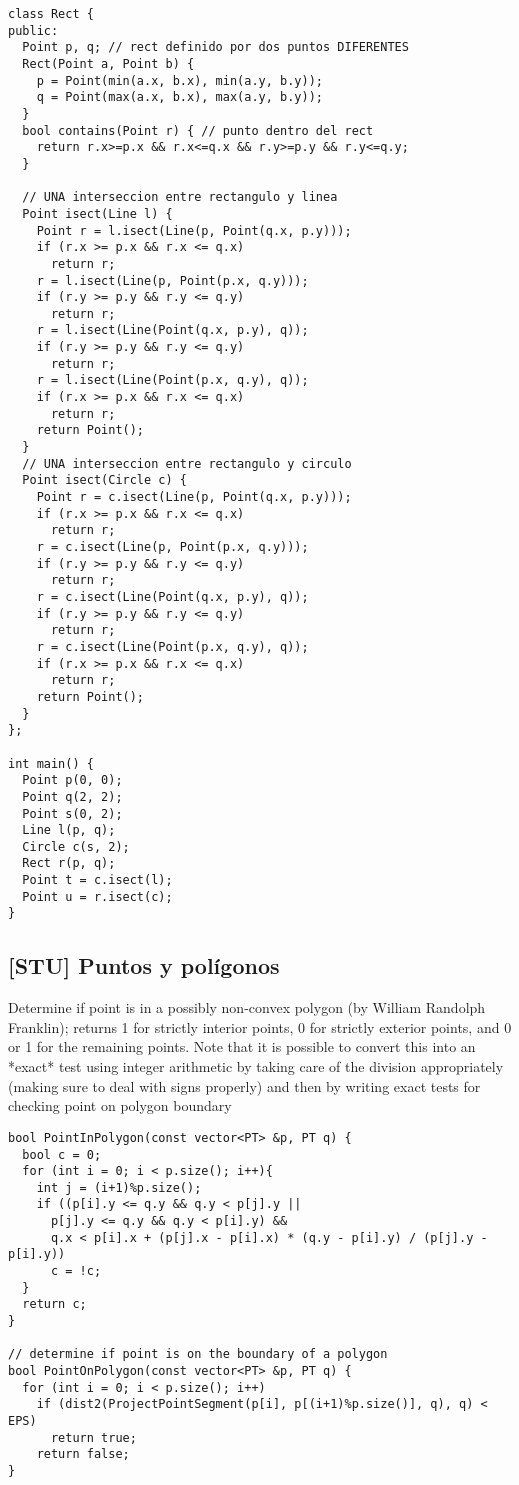 \documentclass[10pt, a4, oneside]{article}
\begin{document}
\begin{verbatim}
class Rect {
public:
  Point p, q; // rect definido por dos puntos DIFERENTES
  Rect(Point a, Point b) {
    p = Point(min(a.x, b.x), min(a.y, b.y));
    q = Point(max(a.x, b.x), max(a.y, b.y));
  }
  bool contains(Point r) { // punto dentro del rect
    return r.x>=p.x && r.x<=q.x && r.y>=p.y && r.y<=q.y;
  }

  // UNA interseccion entre rectangulo y linea
  Point isect(Line l) {
    Point r = l.isect(Line(p, Point(q.x, p.y)));
    if (r.x >= p.x && r.x <= q.x)
      return r;
    r = l.isect(Line(p, Point(p.x, q.y)));
    if (r.y >= p.y && r.y <= q.y)
      return r;
    r = l.isect(Line(Point(q.x, p.y), q));
    if (r.y >= p.y && r.y <= q.y)
      return r;
    r = l.isect(Line(Point(p.x, q.y), q));
    if (r.x >= p.x && r.x <= q.x)
      return r;
    return Point();
  }
  // UNA interseccion entre rectangulo y circulo
  Point isect(Circle c) {
    Point r = c.isect(Line(p, Point(q.x, p.y)));
    if (r.x >= p.x && r.x <= q.x)
      return r;
    r = c.isect(Line(p, Point(p.x, q.y)));
    if (r.y >= p.y && r.y <= q.y)
      return r;
    r = c.isect(Line(Point(q.x, p.y), q));
    if (r.y >= p.y && r.y <= q.y)
      return r;
    r = c.isect(Line(Point(p.x, q.y), q));
    if (r.x >= p.x && r.x <= q.x)
      return r;
    return Point();
  }
};

int main() {
  Point p(0, 0);
  Point q(2, 2);
  Point s(0, 2);
  Line l(p, q);
  Circle c(s, 2);
  Rect r(p, q);
  Point t = c.isect(l);
  Point u = r.isect(c);
}
\end{verbatim}
\subsection{[STU] Puntos y polígonos}
Determine if point is in a possibly non-convex polygon (by William
Randolph Franklin); returns 1 for strictly interior points, 0 for
strictly exterior points, and 0 or 1 for the remaining points.
Note that it is possible to convert this into an *exact* test using
integer arithmetic by taking care of the division appropriately
(making sure to deal with signs properly) and then by writing exact
tests for checking point on polygon boundary
\begin{verbatim}
bool PointInPolygon(const vector<PT> &p, PT q) {
  bool c = 0;
  for (int i = 0; i < p.size(); i++){
    int j = (i+1)%p.size();
    if ((p[i].y <= q.y && q.y < p[j].y || 
      p[j].y <= q.y && q.y < p[i].y) &&
      q.x < p[i].x + (p[j].x - p[i].x) * (q.y - p[i].y) / (p[j].y - p[i].y))
      c = !c;
  }
  return c;
}

// determine if point is on the boundary of a polygon
bool PointOnPolygon(const vector<PT> &p, PT q) {
  for (int i = 0; i < p.size(); i++)
    if (dist2(ProjectPointSegment(p[i], p[(i+1)%p.size()], q), q) < EPS)
      return true;
    return false;
}
\end{verbatim}
\end{document}
